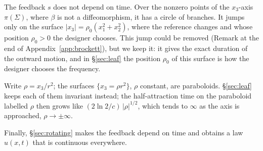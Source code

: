 \documentclass[11pt,reqno]{amsart}
\theoremstyle{plain}
\theoremstyle{definition}
\theoremstyle{remark}
\newcommand{\Sig}{\Sigma}
\begin{document}
The feedback $s$ does not depend on time. Over the nonzero points of the $x_3$-axis $\pi(\Sig)$, where $\beta$ is not a
diffeomorphism, it has a circle of branches. It jumps only on the surface $|x_3|=\rho_0(x_1^{2}+x_2^{2})$,
where the reference changes and whose position $\rho_0>0$ the designer chooses. This jump could be removed
(Remark at the end of Appendix~\ref{app:brockett}), but we keep it: it gives the exact duration of the outward motion,
and in \S\ref{sec:leaf} the position $\rho_0$ of this surface is how the designer chooses the frequency.

Write $\rho=x_3/r^{2}$; the surfaces $\{x_3=\rho r^{2}\}$, $\rho$ constant,
are paraboloids. \S\ref{sec:leaf} keeps each of them invariant instead; the half-attraction time on
the paraboloid labelled $\rho$ then grows like $(2\ln2/c)\,|\rho|^{1/2}$, which tends to $\infty$ as the
axis is approached, $\rho\to\pm\infty$.

Finally, \S\ref{sec:rotating} makes the feedback depend on
time and obtains a law $u(x,t)$ that is continuous everywhere.
\end{document}
